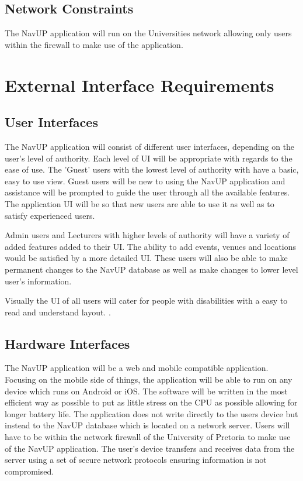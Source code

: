 \documentclass{article}
\begin{document}
 		\subsection{Network Constraints}			 
 				The NavUP application will run on the Universities network allowing only users within the firewall to make use of the application.
 				
 	\pagebreak
 	
	\section{External Interface Requirements}
	
	\subsection{User Interfaces}

The NavUP application will consist of different user interfaces, depending on the user's level of authority. Each level of UI will be appropriate with 
regards to the ease of use. The 'Guest' users with the lowest level of authority with have a basic, easy to use view. Guest users will be new to using
the NavUP application and assistance will be prompted to guide the user through all the available features. The application UI will be so that
new users are able to use it as well as to satisfy experienced users.


Admin users and Lecturers with higher levels of authority will have a variety of added features added to their UI. The ability to add events, venues and
locations would be satisfied by a more detailed UI. These users will also be able to make permanent changes to the NavUP database as well as make changes
to lower level user's information.


Visually the UI of all users will cater for people with disabilities with a easy to read and understand layout.
.	
	\subsection{Hardware Interfaces}
	
	The NavUP application will be a web and mobile compatible application. Focusing on the mobile side of things, the application will be able to run on any
device which runs on Android or iOS. The software will be written in the most efficient way as possible to put as little stress on the CPU as possible
allowing for longer battery life. The application does not write directly to the users device but instead to the NavUP database which is located on a 
network server. Users will have to be within the network firewall of the University of Pretoria to make use of the NavUP application. The user's device
transfers and receives data from the server using a set of secure network protocols ensuring information is not compromised.
\end{document}
